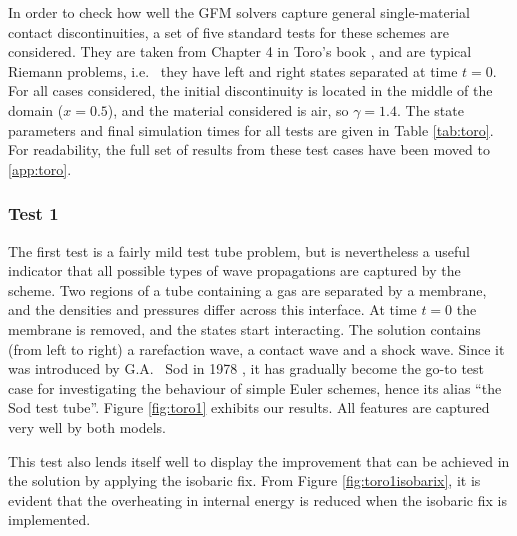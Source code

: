 \documentclass[final,3p,twocolumn]{elsarticle}
\begin{document}
In order to check how well the GFM solvers capture general single-material
contact discontinuities, a set of five standard tests for these schemes are
considered. They are taken from Chapter 4 in Toro's book
\cite{toro2013riemann}, and are typical Riemann problems, i.e.~ they have left
and right states separated at time $t=0$. For all cases considered, the initial
discontinuity is located in the middle of the domain ($x=0.5$), and the
material considered is air, so $\gamma=1.4$.  The state parameters and final
simulation times for all tests are given in Table \ref{tab:toro}. For
readability, the full set of results from these test cases have been moved to
\ref{app:toro}. 

\subsubsection{Test 1}

The first test is a fairly mild test tube problem, but is nevertheless a useful
indicator that all possible types of wave propagations are captured by the
scheme. Two regions of a tube containing a gas are separated by a membrane, and
the densities and pressures differ across this interface. At time $t=0$ the
membrane is removed, and the states start interacting. The solution contains
(from left to right) a rarefaction wave, a contact wave and a shock wave. Since
it was introduced by G.A.~ Sod in 1978 \cite{sod1978survey}, it has gradually
become the go-to test case for investigating the behaviour of simple Euler
schemes, hence its alias ``the Sod test tube''. Figure \ref{fig:toro1} exhibits
our results. All features are captured very well by both models. 

This test also lends itself well to display the improvement that can be
achieved in the solution by applying the isobaric fix. From Figure
\ref{fig:toro1isobarix}, it is evident that the overheating in internal energy
is reduced when the isobaric fix is implemented. 

\end{document}
